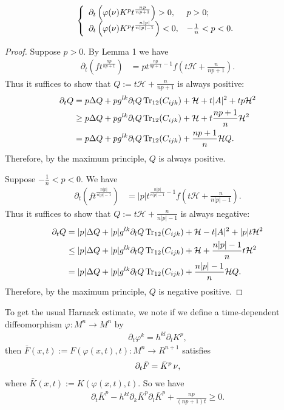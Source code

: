 \documentclass{amsart}
\begin{document}
\begin{theorem}
\[\left\{
  \begin{array}{ll}
    \partial_t \left(\varphi(\operatorname{\nu})K^pt^{\frac{n p }{n p +1}}\right)> 0, & p>0; \\
    \partial_t \left(\varphi(\operatorname{\nu})K^pt^{\frac{n |p| }{n |p| -1}}\right)<0, & -\frac{1}{n}<p<0.
  \end{array}
\right.
\]
\end{theorem}
\begin{proof}
Suppose $p>0.$
By Lemma 1 we have
\begin{align*}
\partial_t \left(ft^{\frac{n p }{n p +1}}\right)&= p  t^{\frac{n p }{n p +1}-1}f\left(t\mathcal{H}+\frac{n}{n p +1}\right).
\end{align*}
Thus it suffices to show that $Q:=t\mathcal{H}+\frac{n}{n p +1}$ is always positive:
\begin{align*}
\partial_t Q&= p\Delta Q+ p  g^{lk}\partial_lQ \operatorname{Tr}_{12}( C _{ijk})+\mathcal{H}+t| A |^2+  tp \mathcal{H}^2\\
&\geq  p \Delta Q+ p  g^{lk}\partial_lQ \operatorname{Tr}_{12}( C _{ijk})+\mathcal{H}+t\frac{n p +1}{n} \mathcal{H}^2\\
&= p \Delta Q+ p  g^{lk}\partial_lQ \operatorname{Tr}_{12}( C _{ijk})+\frac{n p +1}{n}\mathcal{H}Q.
\end{align*}
Therefore, by the maximum principle, $Q$ is always positive.


Suppose $-\frac{1}{n}<p<0.$ We have
\begin{align*}
\partial_t \left(ft^{\frac{n |p| }{n |p| -1}}\right)&= |p|  t^{\frac{n |p| }{n |p| -1}-1}f\left(t\mathcal{H}+\frac{n}{n |p| -1}\right).
\end{align*}
Thus it suffices to show that $Q:=t\mathcal{H}+\frac{n}{n |p| -1}$ is always negative:
\begin{align*}
\partial_t Q&= |p| \Delta Q+ |p|  g^{lk}\partial_lQ \operatorname{Tr}_{12}( C _{ijk})+\mathcal{H}-t| A |^2+ |p|  t \mathcal{H}^2\\
&\leq  |p| \Delta Q+ |p|  g^{lk}\partial_lQ \operatorname{Tr}_{12}( C _{ijk})+\mathcal{H}+\frac{n |p| -1}{n}t \mathcal{H}^2\\
&= |p| \Delta Q+ |p|  g^{lk}\partial_lQ \operatorname{Tr}_{12}( C _{ijk})+\frac{n |p| -1}{n}\mathcal{H}Q.
\end{align*}
Therefore, by the maximum principle, $Q$ is negative positive.
\end{proof}

To get the usual Harnack estimate, we note if we define a time-dependent diffeomorphism $\varphi: M^n\to M^n$ by
\begin{align}
\partial_t\varphi^k=h^{kl}\partial_l K^{ p },
\end{align}
then $\bar{F}(x,t):=F(\varphi(x,t),t):M^{n}\to R^{n+1}$ satisfies
\begin{align}
\partial_t\bar{F}=\bar{K}^{ p }\operatorname{\nu},
\end{align}
where $\bar{K}(x,t):=K(\varphi(x,t),t)$. So we have
\begin{align}
\partial_t\bar{K}^{ p }-h^{kl}\partial_k\bar{K}^{ p }\partial_l\bar{K}^{ p }+\frac{n p }{(n p +1)t}\geq 0.
\end{align}
\end{document}
